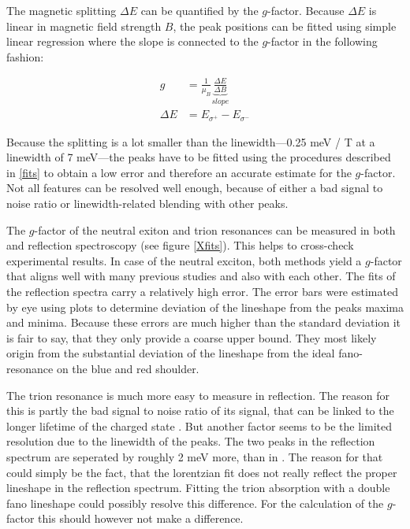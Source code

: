 The magnetic splitting $\Delta E$ can be quantified by the $g$-factor. Because $\Delta E$ is linear in magnetic field strength $B$, the peak positions can be fitted using simple linear regression where the slope is connected to the $g$-factor in the following fashion:

\begin{align}
	g &=  \frac{1}{\mu_B}\underbrace{\frac{\Delta E}{\Delta B}}_{slope} \\
	\Delta E &= E_{\sigma^+} - E_{\sigma^-}
\end{align}

Because the splitting is a lot smaller than the linewidth---0.25 meV / T at a linewidth of 7 meV---the peaks have to be fitted using the procedures described in \ref{fits} to obtain a low error and therefore an accurate estimate for the $g$-factor. Not all features can be resolved well enough, because of either a bad signal to noise ratio or linewidth-related blending with other peaks.

The $g$-factor of the neutral exiton and trion resonances can be measured in both \pl and reflection spectroscopy (see figure \ref{Xfits}). This helps to cross-check experimental results. In case of the neutral exciton, both methods yield a $g$-factor that aligns well with many previous studies  \cite{plechinger_excitonic_2016, stier_exciton_2016, srivastava_valley_2015, mitioglu_magnetoexcitons_2016}and also with each other. The fits of the reflection spectra carry a relatively high error. The error bars were estimated by eye using plots to determine deviation of the lineshape from the peaks maxima and minima. Because these errors are much higher than the standard deviation it is fair to say, that they only provide a coarse upper bound. They most likely origin from the substantial deviation of the lineshape from the ideal fano-resonance on the blue and red shoulder.

The trion resonance is much more easy to measure in reflection. The reason for this is partly the bad signal to noise ratio of its \pl signal, that can be linked to the longer lifetime of the charged state \cite{hao_trion_2017}. But another factor seems to be the limited resolution due to the linewidth of the peaks. The two peaks in the reflection spectrum are seperated by roughly 2 meV more, than in \pl. The reason for that could simply be the fact, that the lorentzian fit does not really reflect the proper lineshape in the reflection spectrum. Fitting the trion absorption with a double fano lineshape could possibly resolve this difference. For the calculation of the $g$-factor this should however not make a difference.

